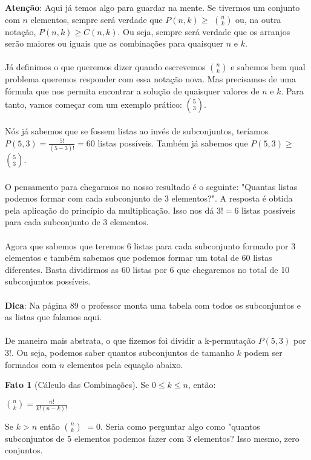 \documentclass[a4paper,11pt]{book}
\theoremstyle{definition}
\theoremstyle{break}
\newtheorem{fact}{Fato}[section]
\begin{document}
\textbf{Atenção}: Aqui já temos algo para guardar na mente. Se tivermos um conjunto com $n$ elementos, sempre será verdade que $P(n,k) \geqslant $ $n \choose k$ ou, na outra notação, $P(n,k) \geqslant C(n,k)$. Ou seja, sempre será verdade que os arranjos serão maiores ou iguais que as combinações para quaisquer $n$ e $k$.
\\
\\
Já definimos o que queremos dizer quando escrevemos $n \choose k$ e sabemos bem qual problema queremos responder com essa notação nova. Mas precisamos de uma fórmula que nos permita encontrar a solução de quaisquer valores de $n$ e $k$. Para tanto, vamos começar com um exemplo prático: $5 \choose 3$.
\\
\\
Nós já sabemos que se fossem listas ao invés de subconjuntos, teríamos $P(5,3) = \frac{5!}{(5 - 3)!} = 60$ listas possíveis. Também já sabemos que $P(5,3) \geqslant $ $5 \choose 3$.
\\
\\
O pensamento para chegarmos no nosso resultado é o seguinte: "Quantas listas podemos formar com cada subconjunto de 3 elementos?". A resposta é obtida pela aplicação do princípio da multiplicação. Isso nos dá $3! = 6$ listas possíveis para cada subconjunto de 3 elementos.
\\
\\
Agora que sabemos que teremos 6 listas para cada subconjunto formado por 3 elementos e também sabemos que podemos formar um total de 60 listas diferentes. Basta dividirmos as 60 listas por 6 que chegaremos no total de 10 subconjuntos possíveis.
\\
\\
\textbf{Dica}: Na página 89 o professor monta uma tabela com todos os subconjuntos e as listas que falamos aqui.
\\
\\
De maneira mais abstrata, o que fizemos foi dividir a k-permutação $P(5,3)$ por $3!$. Ou seja, podemos saber quantos subconjuntos de tamanho $k$ podem ser formados com $n$ elementos pela equação abaixo.

\begin{fact}[Cálculo das Combinações]
Se $0 \leq k \leq n$, então:
\begin{center}
 \Large ${n \choose k} = \frac{n!}{k!(n-k)!}$
\end{center}
\end{fact}

Se $k > n$ então $n \choose k$ $= 0$. Seria como perguntar algo como "quantos subconjuntos de 5 elementos podemos fazer com 3 elementos? Isso mesmo, zero conjuntos.
\end{document}
